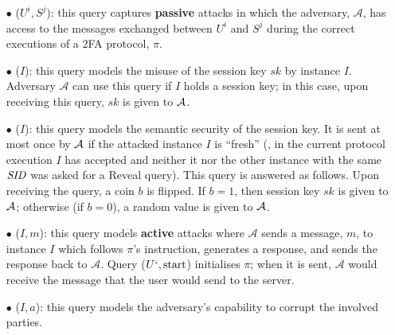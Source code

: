 \begin{itemize}
%
\item [$\bullet$] \execute($U^{i}, S^{j}$): this query captures \textbf{passive} attacks in which the adversary, $\mathcal{A}$, has access to the messages exchanged between $U^{i}$ and $S^{j}$ during the correct executions of a 2FA protocol, $\pi$. 



\item [$\bullet$] \reveal($I$): this query models the misuse of the session key $sk$ by instance $I$.  Adversary $\mathcal{A}$ can use this query if $I$ holds a session key; in this case, upon receiving this query, $sk$ is given to $\mathcal{A}$. 
%



\item [$\bullet$] \test($I$): this query models the semantic security of the session key. It is sent at most once by $\mathcal{A}$ if the attacked instance $I$  is ``fresh'' (\ie, in the current protocol execution $I$ has accepted and neither it nor the other instance with the same $\mathit{SID}$ was asked for a Reveal query). This query is answered as follows. Upon receiving the query, a coin $b$ is flipped. If $b=1$, then session key $sk$ is given to $\mathcal{A}$; otherwise (if $b=0$), a random value is given to $\mathcal{A}$. 



\item [$\bullet$] \send($I, m$):  this query models \textbf{active} attacks where $\mathcal{A}$ sends a message, $m$, to instance $I$ which follows  $\pi$'s instruction, generates a response, and sends the response back to $\mathcal{A}$.  Query  \send($U^{\scriptscriptstyle i}, \text{start}$) initialises $\pi$; when it is sent, $\mathcal{A}$ would receive the message that the user would send to the server. 

%



%
\item [$\bullet$]  \corrupt($I, a$): this query models the adversary's capability to corrupt the involved parties. 




\end{itemize}
